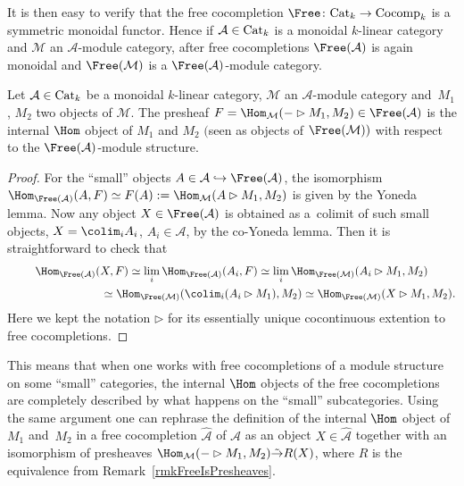 It is then easy to verify that the free cocompletion $\Free\colon {\rm Cat}_k \to {\rm Cocomp}_k$ is a symmetric monoidal functor. Hence if $\mathcal{A} \in {\rm Cat}_k$ is a monoidal $k$-linear category and $\mathcal{M}$ an $\mathcal{A}$-module category, after free cocompletions $\Free(\mathcal{A})$ is again monoidal and $\Free(\mathcal{M})$ is a $\Free(\mathcal{A})$-module category.

\begin{Proposition}\label{propIntHomFree}
Let $\mathcal{A} \in {\rm Cat}_k$ be a monoidal $k$-linear category, $\mathcal{M}$ an $\mathcal{A}$-module category and~$M_1$, $M_2$ two objects of $\mathcal{M}$. The presheaf $F= \Hom_\mathcal{M}(-\rhd M_1,M_2) \in \Free(\mathcal{A})$ is the internal $\Hom$ object of $M_1$ and $M_2$ $($seen as objects of $\Free(\mathcal{M}))$ with respect to the $\Free(\mathcal{A})$-module structure.
\end{Proposition}

\begin{proof}
For the ``small'' objects $A \in \mathcal{A} \hookrightarrow \Free(\mathcal{A})$, the isomorphism $\Hom_{\Free(\mathcal{A})}(A,F)\simeq F(A) := \Hom_{\mathcal{M}}(A\rhd M_1,M_2)$ is given by the Yoneda lemma.
Now any object $X\in\Free(\mathcal{A})$ is obtained as a~colimit of such small objects, $X = \colim_i A_i$, $A_i \in \mathcal{A}$, by the co-Yoneda lemma. Then it is straight\-forward to check that
\begin{gather*}
\Hom_{\Free(\mathcal{A})}(X,F) \simeq \lim_i \Hom_{\Free(\mathcal{A})}(A_i,F) \simeq \lim_i \Hom_{\Free(\mathcal{M})}(A_i \rhd M_1,M_2)
\\ \hphantom{\Hom_{\Free(\mathcal{A})}(X,F)}
{}\simeq \Hom_{\Free(\mathcal{M})}(\colim_i (A_i \rhd M_1),M_2) \simeq \Hom_{\Free(\mathcal{M})}(X \rhd M_1,M_2).
\end{gather*}
Here we kept the notation $\rhd$ for its essentially unique cocontinuous extention to free cocompletions.
\end{proof}

This means that when one works with free cocompletions of a module structure on some ``small'' categories, the internal $\Hom$ objects of the free cocompletions are completely described by what happens on the ``small'' subcategories.
Using the same argument one can rephrase the definition of the internal $\Hom$ object of $M_1$ and~$M_2$ in a free cocompletion $\hat{\mathcal{A}}$ of $\mathcal{A}$ as an object $X\in \hat{\mathcal{A}}$ together with an isomorphism of presheaves $\Hom_\mathcal{M}(-\rhd M_1,M_2) \tilde{\to} R(X)$, where $R$ is the equivalence from Remark~\ref{rmkFreeIsPresheaves}.

